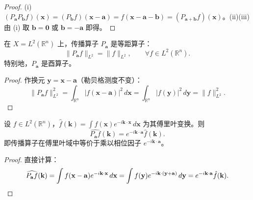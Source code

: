 \begin{proof}
(i) $(P_{\mathbf{a}}P_{\mathbf{b}}f)(\mathbf{x}) = (P_{\mathbf{b}}f)(\mathbf{x}-\mathbf{a}) = f(\mathbf{x}-\mathbf{a}-\mathbf{b}) = (P_{\mathbf{a}+\mathbf{b}}f)(\mathbf{x})$。(ii)(iii) 由 (i) 取 $\mathbf{b}=\mathbf{0}$ 或 $\mathbf{b}=-\mathbf{a}$ 即得。
\end{proof}

\begin{proposition}[传播算子的等距性]\label{prop:propagation_isometry}
在 $X = L^2(\mathbb{R}^n)$ 上，传播算子 $P_{\mathbf{a}}$ 是等距算子：
\[
\|P_{\mathbf{a}} f\|_{L^2} = \|f\|_{L^2}, \qquad \forall f\in L^2(\mathbb{R}^n).
\]
特别地，$P_{\mathbf{a}}$ 是酉算子。
\end{proposition}

\begin{proof}
作换元 $\mathbf{y} = \mathbf{x}-\mathbf{a}$（勒贝格测度不变）：
\[
\|P_{\mathbf{a}} f\|_{L^2}^2 = \int_{\mathbb{R}^n}|f(\mathbf{x}-\mathbf{a})|^2\,d\mathbf{x} = \int_{\mathbb{R}^n}|f(\mathbf{y})|^2\,d\mathbf{y} = \|f\|_{L^2}^2.
\]
\end{proof}

\begin{proposition}[传播算子的傅里叶乘子表示]\label{prop:propagation_fourier}
设 $f\in L^2(\mathbb{R}^n)$，$\hat f(\mathbf{k}) = \int f(\mathbf{x})e^{-i\mathbf{k}\cdot\mathbf{x}}\,d\mathbf{x}$ 为其傅里叶变换。则
\[
\widehat{P_{\mathbf{a}} f}(\mathbf{k}) = e^{-i\mathbf{k}\cdot\mathbf{a}}\hat f(\mathbf{k}).
\]
即传播算子在傅里叶域中等价于乘以相位因子 $e^{-i\mathbf{k}\cdot\mathbf{a}}$。
\end{proposition}

\begin{proof}
直接计算：
\[
\widehat{P_{\mathbf{a}} f}(\mathbf{k}) = \int f(\mathbf{x}-\mathbf{a})e^{-i\mathbf{k}\cdot\mathbf{x}}\,d\mathbf{x} = \int f(\mathbf{y})e^{-i\mathbf{k}\cdot(\mathbf{y}+\mathbf{a})}\,d\mathbf{y} = e^{-i\mathbf{k}\cdot\mathbf{a}}\hat f(\mathbf{k}). \qedhere
\]
\end{proof}

